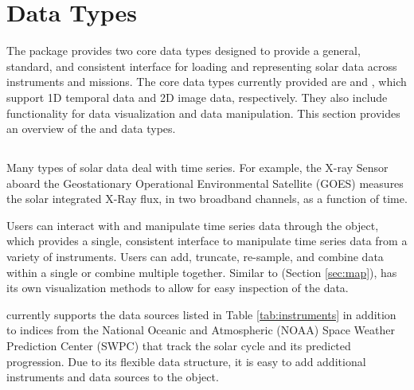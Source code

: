 \section{Data Types}
\label{sec:data_types}

The \sunpypkg package provides two core data types designed to provide a general, standard, and consistent interface for loading and representing solar data across instruments and missions.
The core data types currently provided are \Timeseries and \Map, which support 1D temporal data and 2D image data, respectively. 
They also include functionality for data visualization and data manipulation. 
This section provides an overview of the \Timeseries and \Map data types.

\subsection{\Timeseries}
\label{sec:timeseries}
Many types of solar data deal with time series. 
For example, the X-ray Sensor aboard the Geostationary Operational Environmental Satellite (GOES) measures the solar integrated X-Ray flux, in two broadband channels, as a function of time. 

Users can interact with and manipulate time series data through the \Timeseries object, which provides a single, consistent interface to manipulate time series data from a variety of instruments. 
Users can add, truncate, re-sample, and combine data within a single \Timeseries or combine multiple \Timeseries together. 
Similar to \Map (Section \ref{sec:map}), \Timeseries has its own visualization methods to allow for easy inspection of the data.

\Timeseries currently supports the data sources listed in Table \ref{tab:instruments} in addition to indices from the National Oceanic and Atmospheric (NOAA) Space Weather Prediction Center (SWPC) that track the solar cycle and its predicted progression. Due to its flexible data structure, it is easy to add additional instruments and data sources to the \Timeseries object.

